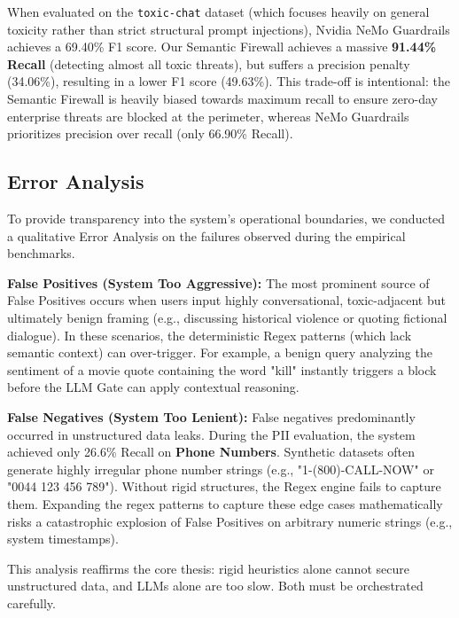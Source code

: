 \documentclass[12pt,a4paper]{article}
\begin{document}
When evaluated on the \texttt{toxic-chat} dataset (which focuses heavily on general toxicity rather than strict structural prompt injections), Nvidia NeMo Guardrails achieves a 69.40\% F1 score. Our Semantic Firewall achieves a massive \textbf{91.44\% Recall} (detecting almost all toxic threats), but suffers a precision penalty (34.06\%), resulting in a lower F1 score (49.63\%). This trade-off is intentional: the Semantic Firewall is heavily biased towards maximum recall to ensure zero-day enterprise threats are blocked at the perimeter, whereas NeMo Guardrails prioritizes precision over recall (only 66.90\% Recall).

\subsection{Error Analysis}

To provide transparency into the system's operational boundaries, we conducted a qualitative Error Analysis on the failures observed during the empirical benchmarks. 

\textbf{False Positives (System Too Aggressive):}
The most prominent source of False Positives occurs when users input highly conversational, toxic-adjacent but ultimately benign framing (e.g., discussing historical violence or quoting fictional dialogue). In these scenarios, the deterministic Regex patterns (which lack semantic context) can over-trigger. For example, a benign query analyzing the sentiment of a movie quote containing the word "kill" instantly triggers a block before the LLM Gate can apply contextual reasoning.

\textbf{False Negatives (System Too Lenient):}
False negatives predominantly occurred in unstructured data leaks. During the PII evaluation, the system achieved only 26.6\% Recall on \textbf{Phone Numbers}. Synthetic datasets often generate highly irregular phone number strings (e.g., "1-(800)-CALL-NOW" or "0044 123 456 789"). Without rigid structures, the Regex engine fails to capture them. Expanding the regex patterns to capture these edge cases mathematically risks a catastrophic explosion of False Positives on arbitrary numeric strings (e.g., system timestamps).

This analysis reaffirms the core thesis: rigid heuristics alone cannot secure unstructured data, and LLMs alone are too slow. Both must be orchestrated carefully.



\end{document}
